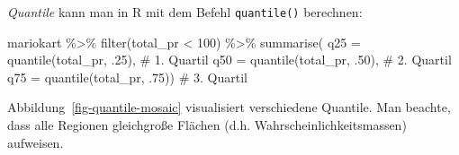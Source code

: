 \documentclass[
  letterpaper,
  twoside,
  open=any]{scrbook}
\newenvironment{Shaded}{\begin{snugshade}}{\end{snugshade}}
\newcommand{\AttributeTok}[1]{\textcolor[rgb]{0.40,0.45,0.13}{#1}}
\newcommand{\CommentTok}[1]{\textcolor[rgb]{0.37,0.37,0.37}{#1}}
\newcommand{\DecValTok}[1]{\textcolor[rgb]{0.68,0.00,0.00}{#1}}
\newcommand{\FunctionTok}[1]{\textcolor[rgb]{0.28,0.35,0.67}{#1}}
\newcommand{\NormalTok}[1]{\textcolor[rgb]{0.00,0.23,0.31}{#1}}
\newcommand{\SpecialCharTok}[1]{\textcolor[rgb]{0.37,0.37,0.37}{#1}}
\theoremstyle{definition}
\theoremstyle{definition}
\theoremstyle{definition}
\theoremstyle{remark}
\begin{document}
\emph{Quantile} kann man in R mit dem Befehl \texttt{quantile()}
berechnen:

\begin{Shaded}
\begin{Highlighting}[]
\NormalTok{mariokart }\SpecialCharTok{\%\textgreater{}\%} 
  \FunctionTok{filter}\NormalTok{(total\_pr }\SpecialCharTok{\textless{}} \DecValTok{100}\NormalTok{) }\SpecialCharTok{\%\textgreater{}\%} 
  \FunctionTok{summarise}\NormalTok{(}
    \AttributeTok{q25 =} \FunctionTok{quantile}\NormalTok{(total\_pr, .}\DecValTok{25}\NormalTok{),  }\CommentTok{\# 1. Quartil}
    \AttributeTok{q50 =} \FunctionTok{quantile}\NormalTok{(total\_pr, .}\DecValTok{50}\NormalTok{),  }\CommentTok{\# 2. Quartil}
    \AttributeTok{q75 =} \FunctionTok{quantile}\NormalTok{(total\_pr, .}\DecValTok{75}\NormalTok{))  }\CommentTok{\# 3. Quartil}
\end{Highlighting}
\end{Shaded}

Abbildung~\ref{fig-quantile-mosaic} visualisiert verschiedene Quantile.
Man beachte, dass alle Regionen gleichgroße Flächen (d.h.
Wahrscheinlichkeitsmassen) aufweisen.
\end{document}
